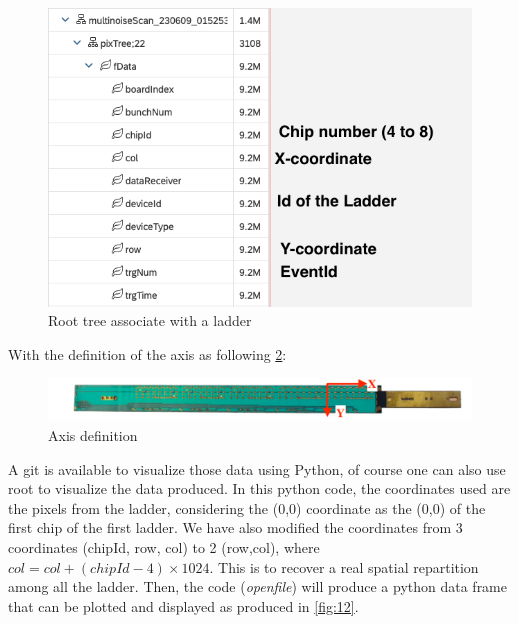 \documentclass[12pt,oneside,a4]{article}
\begin{document}
\begin{figure}[h]
        \centering
        \includegraphics[scale =0.7]{figures/ROOT_file.png}
        \caption{Root tree associate with a ladder}
        \label{fig:10}
\end{figure}

With the definition of the axis as following \ref{fig:11}:

\begin{figure}[h]
        \centering
        \includegraphics[scale =0.7]{figures/Axis.png}
        \caption{Axis definition}
        \label{fig:11}
\end{figure}

A git \cite{DataVisualisation} is available to visualize those data using Python, of course one can also use root to visualize the data produced. 
In this python code, the coordinates used are the pixels from the ladder, considering the (0,0) coordinate as the (0,0) of the first chip of the first ladder. We have also modified the coordinates from 3 coordinates (chipId, row, col) to 2 (row,col), where $col=col+(chipId-4) \times 1024$. This is to recover a real spatial repartition among all the ladder.
Then, the code (\textit{open\textunderscore file}) will produce a python data frame that can be plotted and displayed as produced in \ref{fig:12}.
\end{document}
